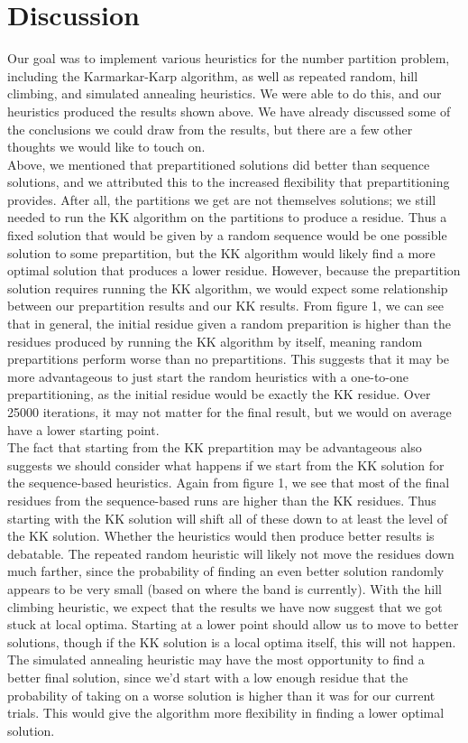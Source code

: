 \documentclass[12pt]{article}
\begin{document}
\section{Discussion}
Our goal was to implement various heuristics for the number partition problem, including the Karmarkar-Karp algorithm, as well as repeated random, hill climbing, and simulated annealing heuristics. We were able to do this, and our heuristics produced the results shown above. We have already discussed some of the conclusions we could draw from the results, but there are a few other thoughts we would like to touch on. \\

Above, we mentioned that prepartitioned solutions did better than sequence solutions, and we attributed this to the increased flexibility that prepartitioning provides. After all, the partitions we get are not themselves solutions; we still needed to run the KK algorithm on the partitions to produce a residue. Thus a fixed solution that would be given by a random sequence would be one possible solution to some prepartition, but the KK algorithm would likely find a more optimal solution that produces a lower residue. However, because the prepartition solution requires running the KK algorithm, we would expect some relationship between our prepartition results and our KK results. From figure 1, we can see that in general, the initial residue given a random preparition is higher than the residues produced by running the KK algorithm by itself, meaning random prepartitions perform worse than no prepartitions. This suggests that it may be more advantageous to just start the random heuristics with a one-to-one prepartitioning, as the initial residue would be exactly the KK residue. Over 25000 iterations, it may not matter for the final result, but we would on average have a lower starting point. \\

The fact that starting from the KK prepartition may be advantageous also suggests we should consider what happens if we start from the KK solution for the sequence-based heuristics. Again from figure 1, we see that most of the final residues from the sequence-based runs are higher than the KK residues. Thus starting with the KK solution will shift all of these down to at least the level of the KK solution. Whether the heuristics would then produce better results is debatable. The repeated random heuristic will likely not move the residues down much farther, since the probability of finding an even better solution randomly appears to be very small (based on where the band is currently). With the hill climbing heuristic, we expect that the results we have now suggest that we got stuck at local optima. Starting at a lower point should allow us to move to better solutions, though if the KK solution is a local optima itself, this will not happen. The simulated annealing heuristic may have the most opportunity to find a better final solution, since we'd start with a low enough residue that the probability of taking on a worse solution is higher than it was for our current trials. This would give the algorithm more flexibility in finding a lower optimal solution. \\
\end{document}
